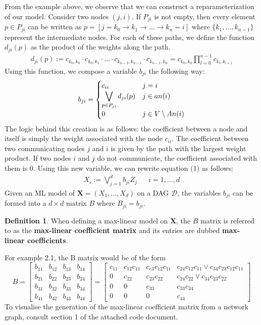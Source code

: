 \documentclass[12pt]{article}
\newcommand{\ds}{\displaystyle}
\theoremstyle{definition}
\theoremstyle{definition}
\newtheorem{definition}{Definition}
\begin{document}
From the example above, we observe that we can construct a reparameterization of our model. Consider two nodes $(j,i)$. If $P_{ji}$ is not empty, then every element $p\in P_{ji}$ can be written as $p= [j=k_0\rightarrow k_1\rightarrow \hdots \rightarrow k_n=i]$
where $\{k_1, \hdots, k_{n-1}\}$ represent the intermediate nodes. For each of these paths, we define the function $d_{ji}(p)$ as the product of the weights along the path.
\begin{align*}
    d_{ji}(p):=c_{k_0,k_0}\cdot c_{k_0,k_1}\cdot\hdots\cdot c_{k_{n-2},k_{n-1}}\cdot c_{k_{n-1},k_n}=c_{k_0,k_0}\prod_{l=0}^{n-1}c_{k_l,k_{l+1}}
\end{align*}
Using this function, we compose a variable $b_{ji}$ the following way:
\begin{align*}
    b_{ji}=\begin{cases}c_{ii} & j=i\cr
    \ds\bigvee_{p\in P_{ji}}d_{ji}(p) &j\in an(i)\cr
    0 & j \in V \setminus An(i)
    \end{cases}
\end{align*}
The logic behind this creation is as follows: the coefficient between a node and itself is simply the weight associated with the node $c_{ii}$. The coefficient between two communicating nodes $j$ and $i$ is given by the path with the largest weight product. If two nodes $i$
 and $j$ do not communicate, the coefficient associated with them is 0. Using this new variable, we can rewrite equation (1) as follows:
 \begin{align*}
     X_i:= \bigvee_{j=1}^db_{ji}Z_j&& i=1,\hdots,d
 \end{align*}
 Given an ML model of $\mathbf{X}=(X_1,\hdots,X_d)$ on a DAG $\mathcal{D}$, the variables $b_{ji}$ can be formed into a $d\times d$ matrix $B$ where $B_{ji}=b_{ji}$.
 \begin{definition}When defining a max-linear model on $\mathbf{X}$, the $B$ matrix is referred to as the \textbf{max-linear coefficient matrix} and its entries are dubbed \textbf{max-linear coefficients}.
 \end{definition}For example 2.1, the B matrix would be of the form 
 \[ B=
\begin{bmatrix}
b_{11} &b_{12} & b_{13}& b_{14}\\
b_{21} &b_{22} & b_{23}& b_{24}\\
b_{31} &b_{32} & b_{33}& b_{34}\\
b_{41} &b_{42} & b_{43}& b_{44}
\end{bmatrix}=
\begin{bmatrix}
c_{11} &c_{12}c_{11} & c_{e3}c_{12}c_{11}& c_{24}c_{12}c_{11}\vee c_{34}c_{23}c_{12}c_{11}\\
0 & c_{22} & c_{23}c_{22}& c_{24}c_{22}\vee c_{34}c_{23}c_{22}\\
0&0 &c_{33} & c_{33}c_{34} \\
0& 0 & 0 & c_{44}
\end{bmatrix}
\]
To visualise the generation of the max-linear coefficient matrix from a network graph, consult section 1 of the attached code document.
\end{document}
